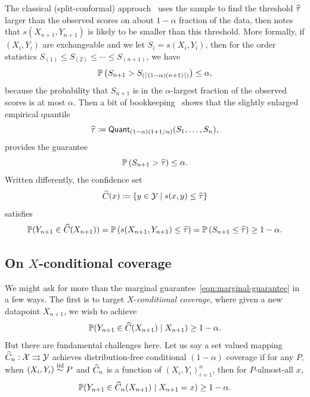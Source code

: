 \documentclass[11pt]{article}
\newcommand{\scorefunc}{s}
\newcommand{\scoreval}{\scorefunc}
\newcommand{\scorerv}{S}
\newcommand{\quant}{\mathsf{Quant}}
\begin{document}
The classical (split-conformal) approach~\cite{VovkGaSh05,BarberCaRaTi21a}
uses the sample to find the threshold $\widehat{\tau}$ larger than the
observed scores on about $1 - \alpha$ fraction of the data, then notes that
$\scoreval(X_{n + 1}, Y_{n + 1})$ is likely to be smaller than this
threshold.
%
More formally, if $(X_i, Y_i)$ are exchangeable and we let $\scorerv_i =
\scoreval(X_i, Y_i)$, then for the order statistics $\scorerv_{(1)} \le
\scorerv_{(2)} \le \cdots \le \scorerv_{(n + 1)}$, we have
\begin{equation*}
  \P\left(\scorerv_{n + 1} > \scorerv_{(\ceil{(1 - \alpha) (n + 1)})}\right)
  \le \alpha,
\end{equation*}
because the probability that $S_{n + 1}$ is in the $\alpha$-largest fraction
of the observed scores is at most $\alpha$.
%
Then a bit of
bookkeeping~\cite[e.g.][Lemma 2]{RomanoPaCa19} shows that the
slightly enlarged empirical quantile
\begin{equation*}
  \what{\tau} \defeq \quant_{(1 - \alpha)(1 + 1/n)}(\scorerv_1, \ldots,
  \scorerv_n),
\end{equation*}
provides the guarantee
\begin{equation*}
  \P\left(\scorerv_{n + 1} > \what{\tau}\right) \le \alpha.
\end{equation*}
Written differently, the confidence set
\begin{equation*}
  \what{C}(x) \defeq \left\{y \in \mc{Y}
  \mid \scorefunc(x, y) \le \what{\tau}\right\}
\end{equation*}
satisfies
\begin{equation*}
  \P(Y_{n + 1} \in \what{C}(X_{n + 1}))
  = \P\left(\scorefunc(X_{n + 1}, Y_{n + 1}) \le \what{\tau}\right)
  = \P\left(\scorerv_{n + 1} \le \what{\tau}\right) \ge 1 - \alpha.
\end{equation*}

\subsection{On $X$-conditional coverage}
\label{sec:intro-x-conditional}

We might ask for more than the marginal
guarantee~\eqref{eqn:marginal-guarantee} in a few ways.
%
The first is to target $X$-\emph{conditional coverage}, where
given a new datapoint $X_{n+1}$, we wish to achieve
\begin{equation*}
  \mathbb{P}(Y_{n + 1} \in \widehat{C}(X_{n + 1}) \mid X_{n + 1}) \ge 1 - \alpha.
\end{equation*}
But there are fundamental challenges here.
%
Let us say a set valued mapping $\widehat{C}_n : \mathcal{X} \rightrightarrows \mathcal{Y}$
achieves distribution-free conditional $(1 - \alpha)$ coverage if
for any $P$, when $(X_i, Y_i) \stackrel{\rm iid}{\sim} P$ and $\widehat{C}_n$ is a function
of $(X_i, Y_i)_{i = 1}^n$, then
for $P$-almost-all $x$,
\begin{equation}
  \label{eqn:x-conditional-coverage}
  \mathbb{P}(Y_{n + 1} \in \widehat{C}_n(X_{n + 1}) \mid X_{n + 1} = x) \ge 1 - \alpha.
\end{equation}
\end{document}
